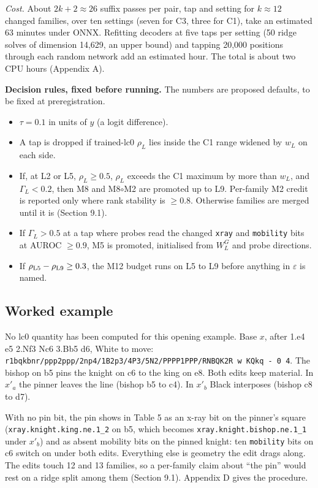 \documentclass[conference]{IEEEtran}
\begin{document}
\emph{Cost.} About $2k+2\approx26$ suffix passes per pair, tap and setting for $k\approx12$ changed families, over ten settings (seven for C3, three for C1), take an estimated 63 minutes under ONNX. Refitting decoders at five taps per setting (50 ridge solves of dimension 14,629, an upper bound) and tapping 20,000 positions through each random network add an estimated hour. The total is about two CPU hours (Appendix A).

\textbf{Decision rules, fixed before running.} The numbers are proposed defaults, to be fixed at preregistration.

\begin{itemize}
\item $\tau=0.1$ in units of $y$ (a logit difference).
\item A tap is dropped if trained-lc0 $\rho_L$ lies inside the C1 range widened by $w_L$ on each side.
\item If, at L2 or L5, $\rho_L\ge0.5$, $\rho_L$ exceeds the C1 maximum by more than $w_L$, and $\Gamma_L<0.2$, then M8 and M8$\circ$M2 are promoted up to L9. Per-family M2 credit is reported only where rank stability is $\ge0.8$. Otherwise families are merged until it is (Section 9.1).
\item If $\Gamma_L>0.5$ at a tap where probes read the changed \texttt{xray} and \texttt{mobility} bits at AUROC $\ge0.9$, M5 is promoted, initialised from $W^G_L$ and probe directions.
\item If $\rho_{\rm L5}-\rho_{\rm L9}\ge0.3$, the M12 budget runs on L5 to L9 before anything in $\varepsilon$ is named.
\end{itemize}

\subsection{Worked example}\label{sec:10.6}
No lc0 quantity has been computed for this opening example. Base $x$, after 1.e4 e5 2.Nf3 Nc6 3.Bb5 d6, White to move: \texttt{r1bqkbnr/\allowbreak{}ppp2ppp/\allowbreak{}2np4/\allowbreak{}1B2p3/\allowbreak{}4P3/\allowbreak{}5N2/\allowbreak{}PPPP1PPP/\allowbreak{}RNBQK2R w KQkq -\allowbreak{} 0 4}. The bishop on b5 pins the knight on c6 to the king on e8. Both edits keep material. In $x'_a$ the pinner leaves the line (bishop b5 to c4). In $x'_b$ Black interposes (bishop c8 to d7).

With no pin bit, the pin shows in Table 5 as an x-ray bit on the pinner's square (\texttt{xray.\allowbreak{}knight.\allowbreak{}king.\allowbreak{}ne.\allowbreak{}1\_\allowbreak{}2} on b5, which becomes \texttt{xray.\allowbreak{}knight.\allowbreak{}bishop.\allowbreak{}ne.\allowbreak{}1\_\allowbreak{}1} under $x'_b$) and as absent mobility bits on the pinned knight: ten \texttt{mobility} bits on c6 switch on under both edits. Everything else is geometry the edit drags along. The edits touch 12 and 13 families, so a per-family claim about ``the pin'' would rest on a ridge split among them (Section 9.1). Appendix D gives the procedure.
\end{document}
